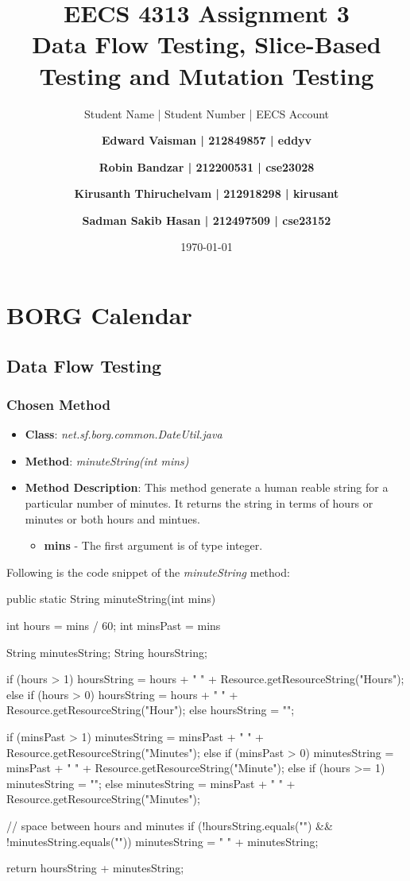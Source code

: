 \documentclass[fontsize=12pt,paper=letter,twoside]{scrartcl}
\author{Student Name | Student Number | EECS Account
\and \textbf{Edward Vaisman | 212849857 | eddyv}
\and \textbf{Robin Bandzar | 212200531 | cse23028}
\and \textbf{Kirusanth Thiruchelvam | 212918298 | kirusant}
\and \textbf{Sadman Sakib Hasan | 212497509 | cse23152}
}
\date{\today} %
\begin{document}
\title{EECS 4313 Assignment 3 \\Data Flow Testing, Slice-Based Testing and Mutation Testing}
\maketitle

\newpage

\tableofcontents
\listoftables
\listoffigures

\newpage


\section{BORG Calendar}

\subsection{Data Flow Testing}

\subsubsection{Chosen Method}

\begin{itemize}
\item \textbf{Class}: \emph{net.sf.borg.common.DateUtil.java}
\item \textbf{Method}: \emph{minuteString(int mins)}
\item \textbf{Method Description}:
This method generate a human reable string for a particular number of minutes. It returns the string in terms of hours or minutes or both hours and mintues.
\begin{itemize}
\item \textbf{mins} - The first argument is of type integer.
\end{itemize}
\end{itemize}

\noindent Following is the code snippet of the \emph{minuteString} method:
\begin{code}
	public static String minuteString(int mins) {
		
		int hours = mins / 60;
		int minsPast = mins %
		
		String minutesString;
		String hoursString;
		
		if (hours > 1) {
			hoursString = hours + " " + Resource.getResourceString("Hours");
		} else if (hours > 0) {
			hoursString = hours + " " + Resource.getResourceString("Hour");
		} else {
			hoursString = "";
		}

		if (minsPast > 1) {
			minutesString = minsPast + " " + Resource.getResourceString("Minutes");
		} else if (minsPast > 0) {
			minutesString = minsPast + " " + Resource.getResourceString("Minute");
		} else if (hours >= 1) {
			minutesString = "";
		} else {
			minutesString = minsPast + " " + Resource.getResourceString("Minutes");
		}

		// space between hours and minutes
		if (!hoursString.equals("") && !minutesString.equals(""))
			minutesString = " " + minutesString;

		return hoursString + minutesString;
	}
\end{code}
\end{document}
